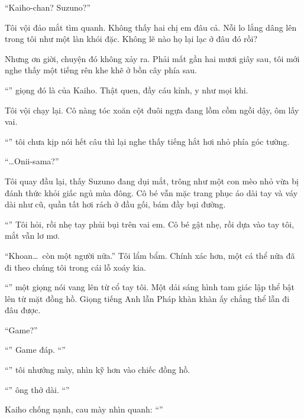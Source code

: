 \documentclass[../main.tex]{subfiles}
\begin{document}
``Kaiho-chan? Suzuno?''

Tôi vội đảo mắt tìm quanh. Không thấy hai chị em đâu cả. Nỗi lo lắng dâng lên trong tôi như một làn khói đặc. Không lẽ nào họ lại lạc ở đâu đó rồi?

Nhưng ơn giời, chuyện đó không xảy ra. Phải mất gần hai mươi giây sau, tôi mới nghe thấy một tiếng rên khe khẽ ở bồn cây phía sau.

``'' giọng đó là của Kaiho. Thật quen, đầy cáu kỉnh, y như mọi khi.

Tôi vội chạy lại. Cô nàng tóc xoăn cột đuôi ngựa đang lồm cồm ngồi dậy, ôm lấy vai.

``'' tôi chưa kịp nói hết câu thì lại nghe thấy tiếng hắt hơi nhỏ phía góc tường.

``\dots Onii-sama?''

Tôi quay đầu lại, thấy Suzuno đang dụi mắt, trông như một con mèo nhỏ vừa bị đánh thức khỏi giấc ngủ mùa đông. Cô bé vẫn mặc trang phục áo dài tay và váy dài như cũ, quần tất hơi rách ở đầu gối, bám đầy bụi đường.

``'' Tôi hỏi, rồi nhẹ tay phủi bụi trên vai em. Cô bé gật nhẹ, rồi dựa vào tay tôi, mắt vẫn lơ mơ.

``Khoan\dots\ còn một người nữa.'' Tôi lẩm bẩm. Chính xác hơn, một cá thể nữa đã đi theo chúng tôi trong cái lỗ xoáy kia.

``'' một giọng nói vang lên từ cổ tay tôi. Một dải sáng hình tam giác lập thể bật lên từ mặt đồng hồ. Giọng tiếng Anh lẫn Pháp khàn khàn ấy chẳng thể lẫn đi đâu được.

``Game?''

``'' Game đáp. ``''

``'' tôi nhướng mày, nhìn kỹ hơn vào chiếc đồng hồ.

``'' ông thở dài. ``''

Kaiho chống nạnh, cau mày nhìn quanh: ``''
\end{document}
